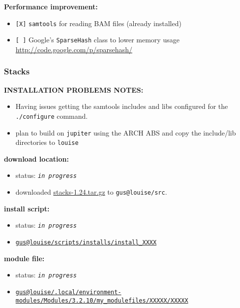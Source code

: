 \documentclass[letterpaper]{scrartcl}
\begin{document}
\textbf{Performance improvement:}

\begin{itemize}
\itemsep1pt\parskip0pt
\item
  \texttt{{[}X{]}} \texttt{samtools} for reading BAM files (already
  installed)
\item
  \texttt{{[} {]}} Google's \texttt{SparseHash} class to lower memory
  usage \url{http://code.google.com/p/sparsehash/}
\end{itemize}

\subsubsection{Stacks}\label{stacks}

\textbf{INSTALLATION PROBLEMS NOTES:}

\begin{itemize}
\itemsep1pt\parskip0pt
\item
  Having issues getting the samtools includes and libs configured for
  the \texttt{./configure} command.
\item
  plan to build on \texttt{jupiter} using the ARCH ABS and copy the
  include/lib directories to \texttt{louise}
\end{itemize}

\textbf{download location:}

\begin{itemize}
\item
  status: \emph{\texttt{in progress}}
\item
  downloaded
  \href{http://creskolab.uoregon.edu/stacks/source/stacks-1.24.tar.gz}{stacks-1.24.tar.gz}
  to \texttt{gus@louise/src}.
\end{itemize}

\textbf{install script:}

\begin{itemize}
\item
  status: \emph{\texttt{in progress}}
\item
  \href{file:///home/gus/remote_mounts/louise/scripts/installs/install_XXXXXXX}{\texttt{gus@louise/scripts/installs/install\_XXXX}}
\end{itemize}

\textbf{module file:}

\begin{itemize}
\item
  status: \emph{\texttt{in progress}}
\item
  \href{/home/gus/remote_mounts/louise/.local/environment-modules/Modules/3.2.10/my_modulefiles/XXXXX/XXXXX}{\texttt{gus@louise/.local/environment-modules/Modules/3.2.10/my\_modulefiles/XXXXX/XXXXX}}
\end{itemize}
\end{document}
